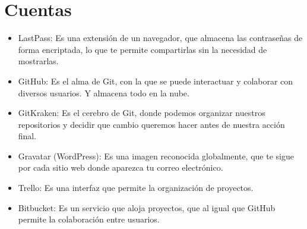 \documentclass[12pt,letterpaper]{article}
\begin{document}
\section*{Cuentas}
\begin{itemize}
\item LastPass: Es una extensión de un navegador, que almacena las contraseñas de forma encriptada, lo que te permite compartirlas sin la necesidad de mostrarlas.
\item GitHub: Es el alma de Git, con la que se puede interactuar y colaborar con diversos usuarios. Y almacena todo en la nube.
\item GitKraken: Es el cerebro de Git, donde podemos organizar nuestros repositorios y decidir que cambio queremos hacer antes de nuestra acción final.
\item Gravatar (WordPress): Es una imagen reconocida globalmente, que te sigue por cada sitio web donde aparezca tu correo electrónico.
\item Trello: Es una interfaz que permite la organización de proyectos.
\item Bitbucket: Es un servicio que aloja proyectos, que al igual que GitHub permite la colaboración entre usuarios.
\end{itemize}

 

\end{document}
